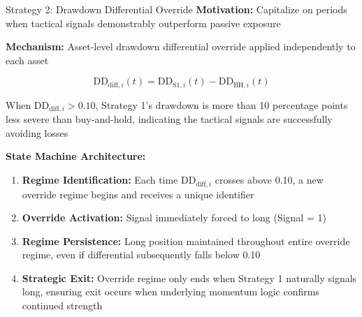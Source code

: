 \documentclass[aspectratio=169,10pt]{beamer}
\begin{document}
\begin{frame}{Strategy 2: Drawdown Differential Override}
\textbf{Motivation:} Capitalize on periods when tactical signals demonstrably outperform passive exposure

\vspace{0.3cm}

\textbf{Mechanism:} Asset-level drawdown differential override applied independently to each asset

$$\text{DD}_{\text{diff},i}(t) = \text{DD}_{\text{S1},i}(t) - \text{DD}_{\text{BH},i}(t)$$

\vspace{0.2cm}

When $\text{DD}_{\text{diff},i} > 0.10$, Strategy 1's drawdown is more than 10 percentage points less severe than buy-and-hold, indicating the tactical signals are successfully avoiding losses

\vspace{0.3cm}

\textbf{State Machine Architecture:}
\begin{enumerate}
    \item \textbf{Regime Identification:} Each time $\text{DD}_{\text{diff},i}$ crosses above 0.10, a new override regime begins and receives a unique identifier

    \item \textbf{Override Activation:} Signal immediately forced to long (Signal = 1)

    \item \textbf{Regime Persistence:} Long position maintained throughout entire override regime, even if differential subsequently falls below 0.10

    \item \textbf{Strategic Exit:} Override regime only ends when Strategy 1 naturally signals long, ensuring exit occurs when underlying momentum logic confirms continued strength
\end{enumerate}
\end{frame}
\end{document}
